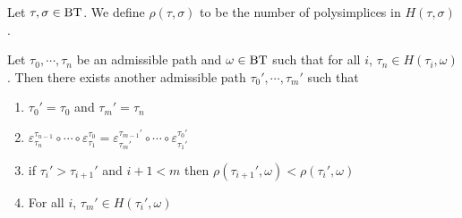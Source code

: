 \documentclass[a4paper,10pt]{amsart}
\begin{document}
\begin{Def}
Let $\tau,\sigma \in \bt$. We define $\rho(\tau,\sigma)$ to be the number of polysimplices in $H(\tau,\sigma)$.{}
\end{Def}

\begin{Lem}
\label{lemsimplificationchemin}
Let $\tau_{0},\cdots,\tau_{n}$ be an admissible path and $\omega \in \bt$ such that for all $i$, $\tau_{n} \in H(\tau_{i},\omega)$. Then there exists another admissible path $\tau_{0}',\cdots,\tau_{m}'$ such that
\begin{enumerate}
\item $\tau_{0}'=\tau_{0}$ and $\tau_{m}'=\tau_{n}$
\item $\varepsilon^{\tau_{n-1}}_{\tau_{n}} \circ \cdots \circ \varepsilon_{\tau_{1}}^{\tau_{0}} = \varepsilon^{\tau_{m-1}'}_{\tau_{m}'} \circ \cdots \circ \varepsilon_{\tau_{1}'}^{\tau_{0}'}$
\item if $\tau_{i}'>\tau_{i+1}'$ and $i+1 < m$ then $\rho(\tau_{i+1}',\omega)<\rho(\tau_{i}',\omega)$
\item For all $i$, $\tau_{m}' \in H(\tau_{i}',\omega)$
\end{enumerate}
\end{Lem}
\end{document}
